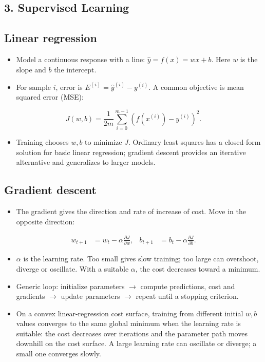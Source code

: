 \documentclass[10pt,a4paper]{ctexart}
\newcommand{\formula}[1]{%
  \par\vspace{1pt}\begingroup
  \setlength{\abovedisplayskip}{0pt}\setlength{\belowdisplayskip}{0pt}
  \[ #1 \]\endgroup\vspace{1pt}}
\begin{document}
\begin{multicols*}{2}
\section{3. Supervised Learning}
\subsection{Linear regression}
\begin{itemize}
  \item Model a continuous response with a line: \(\hat y=f(x)=wx+b\). Here \(w\) is the slope and \(b\) the intercept.
  \item For sample \(i\), error is \(E^{(i)}=\hat y^{(i)}-y^{(i)}\). A common objective is mean squared error (MSE):
\end{itemize}
\formula{J(w,b)=\frac{1}{2m}\sum_{i=0}^{m-1}\left(f(x^{(i)})-y^{(i)}\right)^2.}
\begin{itemize}
  \item Training chooses \(w,b\) to minimize \(J\). Ordinary least squares has a closed-form solution for basic linear regression; gradient descent provides an iterative alternative and generalizes to larger models.
\end{itemize}

\subsection{Gradient descent}
\begin{itemize}
  \item The gradient gives the direction and rate of increase of cost. Move in the opposite direction:
\end{itemize}
\formula{\begin{aligned}
w_{t+1}&=w_t-\alpha\frac{\partial J}{\partial w},&
b_{t+1}&=b_t-\alpha\frac{\partial J}{\partial b}.
\end{aligned}}
\begin{itemize}
  \item \(\alpha\) is the learning rate. Too small gives slow training; too large can overshoot, diverge or oscillate. With a suitable \(\alpha\), the cost decreases toward a minimum.
  \item Generic loop: initialize parameters \(\rightarrow\) compute predictions, cost and gradients \(\rightarrow\) update parameters \(\rightarrow\) repeat until a stopping criterion.
  \item On a convex linear-regression cost surface, training from different initial \(w,b\) values
  converges to the same global minimum when the learning rate is suitable: the cost decreases over
  iterations and the parameter path moves downhill on the cost surface. A large learning rate can
  oscillate or diverge; a small one converges slowly.
\end{itemize}


\end{multicols*}
\end{document}
